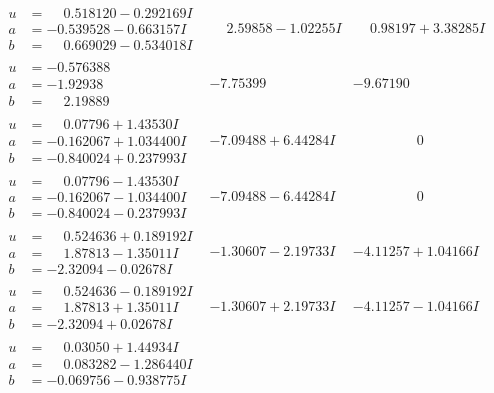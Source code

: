 \documentclass[1p]{elsarticle_modified}
\theoremstyle{definition}
\begin{document}
$$\begin{array}{c|c|c}
\begin{aligned}
u &= \phantom{-}0.518120 - 0.292169 I \\
a &= -0.539528 - 0.663157 I \\
b &= \phantom{-}0.669029 - 0.534018 I\end{aligned}
 & \phantom{-}2.59858 - 1.02255 I & \phantom{-}0.98197 + 3.38285 I \\ \hline\begin{aligned}
u &= -0.576388\phantom{ +0.000000I} \\
a &= -1.92938\phantom{ +0.000000I} \\
b &= \phantom{-}2.19889\phantom{ +0.000000I}\end{aligned}
 & -7.75399\phantom{ +0.000000I} & -9.67190\phantom{ +0.000000I} \\ \hline\begin{aligned}
u &= \phantom{-}0.07796 + 1.43530 I \\
a &= -0.162067 + 1.034400 I \\
b &= -0.840024 + 0.237993 I\end{aligned}
 & -7.09488 + 6.44284 I & \phantom{-0.000000 } 0 \\ \hline\begin{aligned}
u &= \phantom{-}0.07796 - 1.43530 I \\
a &= -0.162067 - 1.034400 I \\
b &= -0.840024 - 0.237993 I\end{aligned}
 & -7.09488 - 6.44284 I & \phantom{-0.000000 } 0 \\ \hline\begin{aligned}
u &= \phantom{-}0.524636 + 0.189192 I \\
a &= \phantom{-}1.87813 - 1.35011 I \\
b &= -2.32094 - 0.02678 I\end{aligned}
 & -1.30607 - 2.19733 I & -4.11257 + 1.04166 I \\ \hline\begin{aligned}
u &= \phantom{-}0.524636 - 0.189192 I \\
a &= \phantom{-}1.87813 + 1.35011 I \\
b &= -2.32094 + 0.02678 I\end{aligned}
 & -1.30607 + 2.19733 I & -4.11257 - 1.04166 I \\ \hline\begin{aligned}
u &= \phantom{-}0.03050 + 1.44934 I \\
a &= \phantom{-}0.083282 - 1.286440 I \\
b &= -0.069756 - 0.938775 I\end{aligned}

\end{array}$$
\end{document}
